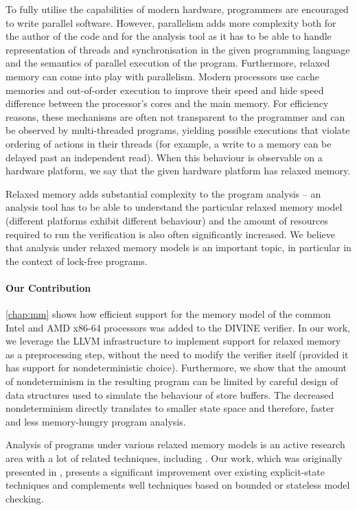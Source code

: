 To fully utilise the capabilities of modern hardware, programmers are encouraged to write parallel software.
However, parallelism adds more complexity both for the author of the code and for the analysis tool as it has to be able to handle representation of threads and synchronisation in the given programming language and the semantics of parallel execution of the program.
Furthermore, relaxed memory can come into play with parallelism.
Modern processors use cache memories and out-of-order execution to improve their speed and hide speed difference between the processor's cores and the main memory.
For efficiency reasons, these mechanisms are often not transparent to the programmer and can be observed by multi-threaded programs, yielding possible executions that violate ordering of actions in their threads (for example, a write to a memory can be delayed past an independent read).
When this behaviour is observable on a hardware platform, we say that the given hardware platform has relaxed memory.

Relaxed memory adds substantial complexity to the program analysis --
an analysis tool has to be able to understand the particular relaxed memory model (different platforms exhibit different behaviour) and the amount of resources required to run the verification is also often significantly increased.
We believe that analysis under relaxed memory models is an important topic,
in particular in the context of lock-free programs.

\paragraph{Our Contribution}

\autoref{chap:mm} shows how efficient support for the memory model of the common Intel and AMD x86-64 processors was added to the DIVINE verifier.
In our work, we leverage the LLVM infrastructure to implement support for
relaxed memory as a preprocessing step, without the need to modify the verifier
itself (provided it has support for nondeterministic choice).
Furthermore, we show that the amount of nondeterminism in the resulting program
can be limited by careful design of data structures used to simulate the
behaviour of \xtso store buffers.
The decreased nondeterminism directly translates to smaller state space and therefore, faster and less memory-hungry program analysis.

Analysis of programs under various relaxed memory models is an active research area with a lot of related techniques, including .
Our work, which was originally presented in , presents a significant improvement over existing explicit-state techniques and complements well techniques based on bounded or stateless model checking.


